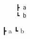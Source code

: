 \documentclass{article}
\begin{document}
	\begin{verbatim}
	┣ a
	┗ b
	\end{verbatim}
	
	\begin{coloredlisting}
	┣ a
	┗ b
	\end{coloredlisting}
	
\end{document}
